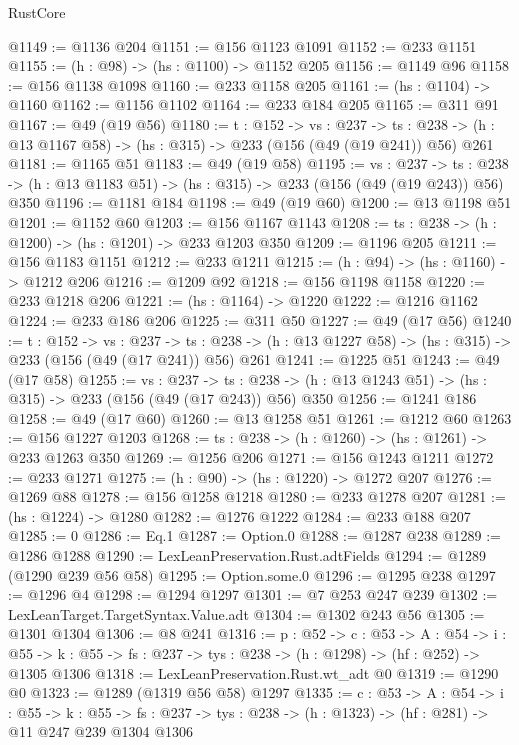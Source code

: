 \begin{lexlean}{RustCore}
\begin{coremodule}
@1149 := @1136 @204
@1151 := @156 @1123 @1091
@1152 := @233 @1151
@1155 := (h : @98) -> (hs : @1100) -> @1152 @205
@1156 := @1149 @96
@1158 := @156 @1138 @1098
@1160 := @233 @1158 @205
@1161 := (hs : @1104) -> @1160
@1162 := @1156 @1102
@1164 := @233 @184 @205
@1165 := @311 @91
@1167 := @49 (@19 @56)
@1180 := {t : @152} ->
  {vs : @237} ->
  {ts : @238} -> (h : @13 @1167 @58) -> (hs : @315) -> @233 (@156 (@49 (@19 @241)) @56) @261
@1181 := @1165 @51
@1183 := @49 (@19 @58)
@1195 := {vs : @237} ->
  {ts : @238} -> (h : @13 @1183 @51) -> (hs : @315) -> @233 (@156 (@49 (@19 @243)) @56) @350
@1196 := @1181 @184
@1198 := @49 (@19 @60)
@1200 := @13 @1198 @51
@1201 := @1152 @60
@1203 := @156 @1167 @1143
@1208 := {ts : @238} -> (h : @1200) -> (hs : @1201) -> @233 @1203 @350
@1209 := @1196 @205
@1211 := @156 @1183 @1151
@1212 := @233 @1211
@1215 := (h : @94) -> (hs : @1160) -> @1212 @206
@1216 := @1209 @92
@1218 := @156 @1198 @1158
@1220 := @233 @1218 @206
@1221 := (hs : @1164) -> @1220
@1222 := @1216 @1162
@1224 := @233 @186 @206
@1225 := @311 @50
@1227 := @49 (@17 @56)
@1240 := {t : @152} ->
  {vs : @237} ->
  {ts : @238} -> (h : @13 @1227 @58) -> (hs : @315) -> @233 (@156 (@49 (@17 @241)) @56) @261
@1241 := @1225 @51
@1243 := @49 (@17 @58)
@1255 := {vs : @237} ->
  {ts : @238} -> (h : @13 @1243 @51) -> (hs : @315) -> @233 (@156 (@49 (@17 @243)) @56) @350
@1256 := @1241 @186
@1258 := @49 (@17 @60)
@1260 := @13 @1258 @51
@1261 := @1212 @60
@1263 := @156 @1227 @1203
@1268 := {ts : @238} -> (h : @1260) -> (hs : @1261) -> @233 @1263 @350
@1269 := @1256 @206
@1271 := @156 @1243 @1211
@1272 := @233 @1271
@1275 := (h : @90) -> (hs : @1220) -> @1272 @207
@1276 := @1269 @88
@1278 := @156 @1258 @1218
@1280 := @233 @1278 @207
@1281 := (hs : @1224) -> @1280
@1282 := @1276 @1222
@1284 := @233 @188 @207
@1285 := 0
@1286 := Eq.{1}
@1287 := Option.{0}
@1288 := @1287 @238
@1289 := @1286 @1288
@1290 := LexLeanPreservation.Rust.adtFields
@1294 := @1289 (@1290 @239 @56 @58)
@1295 := Option.some.{0}
@1296 := @1295 @238
@1297 := @1296 @4
@1298 := @1294 @1297
@1301 := @7 @253 @247 @239
@1302 := LexLeanTarget.TargetSyntax.Value.adt
@1304 := @1302 @243 @56
@1305 := @1301 @1304
@1306 := @8 @241
@1316 := {p : @52} ->
  {c : @53} ->
  {A : @54} ->
  {i : @55} -> {k : @55} -> {fs : @237} -> {tys : @238} -> (h : @1298) -> (hf : @252) -> @1305 @1306
@1318 := LexLeanPreservation.Rust.wt_adt @0
@1319 := @1290 @0
@1323 := @1289 (@1319 @56 @58) @1297
@1335 := {c : @53} ->
  {A : @54} ->
  {i : @55} ->
  {k : @55} ->
  {fs : @237} -> {tys : @238} -> (h : @1323) -> (hf : @281) -> @11 @247 @239 @1304 @1306

\end{coremodule}
\end{lexlean}
